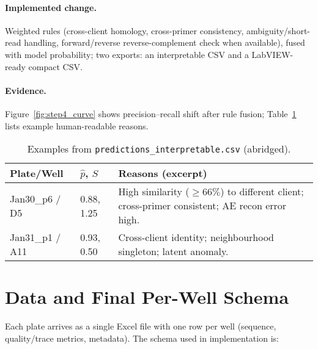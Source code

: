 \paragraph{Implemented change.}
Weighted rules (cross-client homology, cross-primer consistency, ambiguity/short-read handling, forward/reverse reverse-complement check when available), fused with model probability; two exports: an interpretable CSV and a LabVIEW-ready compact CSV.

\paragraph{Evidence.}
Figure~\ref{fig:step4_curve} shows precision–recall shift after rule fusion; Table~\ref{tab:step4_examples} lists example human-readable reasons.


\begin{table}[H]
\centering
\caption{Examples from \texttt{predictions\_interpretable.csv} (abridged).}
\label{tab:step4_examples}
\begin{tabular}{|l|l|p{8.2cm}|}
\hline
\textbf{Plate/Well} & \textbf{$\hat p$, $S$} & \textbf{Reasons (excerpt)} \\\hline
Jan30\_p6 / D5 & 0.88, 1.25 & High similarity ($\geq 66\%$) to different client; cross-primer consistent; AE recon error high. \\\hline
Jan31\_p1 / A11 & 0.93, 0.50 & Cross-client identity; neighbourhood singleton; latent anomaly. \\\hline
\end{tabular}
\end{table}


\section{Data and Final Per-Well Schema}
\label{sec:data_schema}
Each plate arrives as a single Excel file with one row per well (sequence, quality/trace metrics, metadata). The schema used in implementation is:

